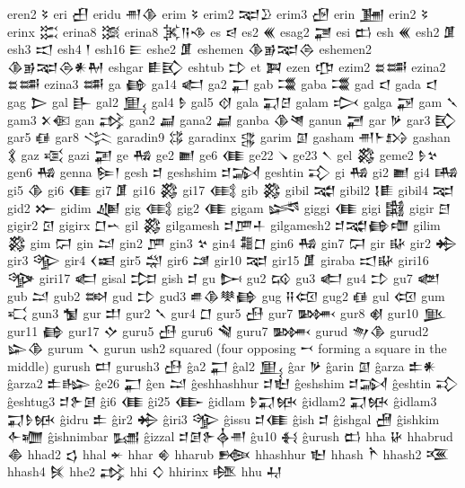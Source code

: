  eren2  𒂟   
 eri  𒌷
 eridu 𒉣𒆠
 erim  𒂟   
 erim2  𒉈𒊒    
 erim3  𒌿   
 erin  𒂞   
 erin2  𒂟   
 erinx  𒈶   
 erina8  𒈷   
 erina8  𒈸𒀀𒈾    
 es  𒁀   
 es2  𒌍   
 esag2  𒃥   
 esi  𒆗   
 esh  𒌍   
 esh2  𒂠   
 esh3  𒀊   
 esh4  𒁹   
 esh16  𒀼   
 eshe2  𒂠   
 eshemen  𒆠𒂊𒉈𒁲    
 eshemen2  𒆠𒂊𒉈𒁲𒀭𒈹    
 eshgar  𒀾𒃼    
 eshtub  𒄞   
 et  𒀉   
 ezen  𒂡   
 ezim2  𒊺𒌁    
 ezina2  𒊺𒌁    
 ezina3  𒌁   
 ga  𒂵   
 ga14  𒅗   
 ga2  𒂷   
 gab  𒃮   
 gaba  𒃮   
 gad  𒃰   
 gada  𒃰   
 gag  𒆕   
 gal  𒃲   
 gal2  𒅅   
 gal4  𒊩   
 gal5  𒋼   
 gala  𒍑𒆪    
 galam  𒃴   
 galga  𒃌   
 gam  𒃵   
 gam3  𒉽𒈿    
 gan  𒃶   
 gan2  𒃷   
 gana2  𒃷   
 ganba  𒆠𒇴    
 ganun  𒃠   
 gar  𒃻   
 gar3  𒃼   
 gar5  𒈖   
 gar8  𒋞   
 garadin9  𒌏   
 garadinx  𒃱   
 garim  𒇑   
 gasham  𒉣𒈨𒋳    
 gashan  𒃽   
 gaz  𒄤   
 gazi  𒃢   
 ge  𒄀   
 ge2  𒆤   
 ge6  𒈪   
 ge22  𒀺   
 ge23  𒀹   
 gel  𒄃   
 geme2  𒊩𒆳    
 gen6  𒄀   
 genna  𒌉𒁹    
 gesh  𒄑   
 geshshim  𒄑𒋆    
 geshtin  𒃾   
 gi  𒄀   
 gi2  𒆤   
 gi4  𒄄   
 gi5  𒆠   
 gi6  𒈪   
 gi7  𒂠   
 gi16  𒄃   
 gi17  𒍼   
 gib  𒄃   
 gibil  𒉋   
 gibil2  𒋙𒀾    
 gibil4  𒉈   
 gid2  𒁍   
 gidim  𒄇   
 gig  𒍼   
 gig2  𒈪   
 gigam  𒈓   
 giggi  𒈪   
 gigi  𒄅   
 gigir  𒇀   
 gigir2  𒇥   
 gigirx  𒆸𒌀      
 gil  𒄃   
 gilgamesh  𒄑𒂆𒈦    
 gilgamesh2  𒄑𒉋𒂵𒈩    
 gilim  𒄃   
 gim  𒁶   
 gin  𒁺   
 gin2  𒂆   
 gin3  𒆳   
 gin4  𒍤𒆸    
 gin6  𒄀   
 gin7  𒁶   
 gir  𒄫   
 gir2  𒄈   
 gir3  𒄊   
 gir4  𒌋𒀜    
 gir5  𒁽   
 gir6  𒁼   
 gir10  𒉈   
 gir15  𒂠   
 giraba  𒀊𒄫    
 giri16  𒄌   
 giri17  𒅗   
 gisal  𒄐   
 gish  𒄑   
 gu  𒄖   
 gu2  𒄘   
 gu3  𒅗   
 gu4  𒄞   
 gu7  𒅥   
 gub  𒁺   
 gub2  𒇷   
 gud  𒄞   
 gud3  𒌑𒆠𒋧𒂵    
 gug  𒍝𒄢    
 gug2  𒈖   
 gul  𒄢   
 gum  𒄣   
 gun3  𒁯   
 gur  𒄥   
 gur2  𒃵   
 gur4  𒆸   
 gur5  𒍀   
 gur7  𒄦   
 gur8  𒋽   
 gur10  𒆥   
 gur11  𒂵   
 gur17  𒄕   
 guru5  𒍀   
 guru6  𒃸   
 guru7  𒄦   
 gurud  𒉩𒆠    
 gurud2  𒇽𒆠    
 gurum  𒃵   
 gurun  ush2 squared (four opposing 𒍗 forming a square in the  
   middle)   
 gurush  𒄨   
 gurush3  𒍀   
 ĝa2  𒂷   
 ĝal2  𒅅   
 ĝar  𒃻   
 ĝarin  𒇑   
 ĝarza  𒉺𒀭    
 ĝarza2  𒉺𒈗    
 ĝe26  𒂷   
 ĝen  𒁺   
 ĝeshhashhur  𒄑𒈢    
 ĝeshshim  𒄑𒋆    
 ĝeshtin  𒃾   
 ĝeshtug3  𒄑𒉿𒌆    
 ĝi6  𒈪   
 ĝi25  𒂂   
 ĝidlam  𒊩𒍑𒁮    
 ĝidlam2  𒍑𒁮    
 ĝidlam3  𒍑𒊩𒁮    
 ĝidru  𒉺   
 ĝir2  𒄈   
 ĝiri3  𒄊   
 ĝissu  𒄑𒈪    
 ĝish  𒄑   
 ĝishgal  𒍇   
 ĝishkim  𒅆𒁾    
 ĝishnimbar  𒊷   
 ĝizzal  𒄑𒌆𒉿𒎓𒉣    
 ĝu10  𒈬   
 ĝurush  𒆗   
 hha  𒄩   
 hhabrud  𒆢   
 hhad2  𒌓   
 hhal  𒄬   
 hhar  𒄯   
 hharub  𒁬   
 hhashhur  𒈢   
 hhash  𒋻   
 hhash2  𒍨   
 hhash4  𒍮   
 hhe2  𒃶   
 hhi  𒄭   
 hhirinx  𒆶   
 hhu  𒄷   
